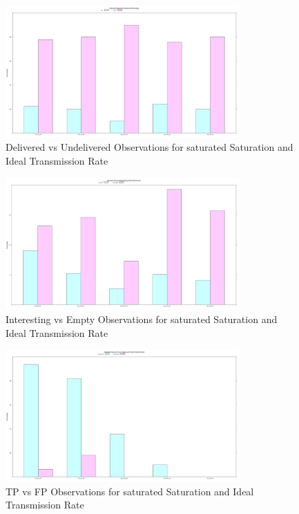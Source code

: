 	\begin{figure}[H]
	\centering
	\includegraphics[width=0.8\textwidth]{Chap7/figures/plots/saturated_ideal/delvsundel_percent.png}
	\caption{Delivered vs Undelivered Observations for saturated Saturation and Ideal Transmission Rate}
	\label{fig:sim:res:sat:ideal:delundel}
	\end{figure}

	\begin{figure}[H]
	\centering
	\includegraphics[width=0.8\textwidth]{Chap7/figures/plots/saturated_ideal/emptvsint_percent.png}
	\caption{Interesting vs Empty Observations for saturated Saturation and Ideal Transmission Rate}
	\label{fig:sim:res:sat:ideal:emptint}
	\end{figure}

	\begin{figure}[H]
	\centering
	\includegraphics[width=0.8\textwidth]{Chap7/figures/plots/saturated_ideal/tpvsfp_percent.png}
	\caption{TP vs FP Observations for saturated Saturation and Ideal Transmission Rate}
	\label{fig:sim:res:sat:ideal:tpfp}
	\end{figure}

